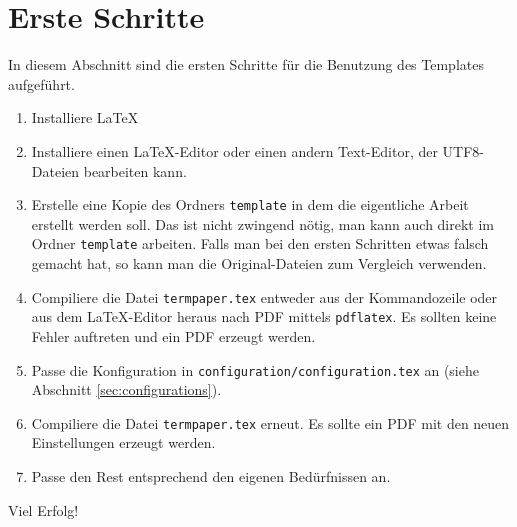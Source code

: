 %
\section{Erste Schritte}
In diesem Abschnitt sind die ersten Schritte für die Benutzung des Templates aufgeführt.
\begin{enumerate}
\item Installiere \LaTeX
\item Installiere einen \LaTeX-Editor oder einen andern Text-Editor, der UTF8-Dateien bearbeiten kann.
\item Erstelle eine Kopie des Ordners \texttt{template} in dem die eigentliche Arbeit erstellt werden soll. Das ist nicht zwingend nötig, man kann auch direkt im Ordner \texttt{template} arbeiten. Falls man bei den ersten Schritten etwas falsch gemacht hat, so kann man die Original-Dateien zum Vergleich verwenden.
\item Compiliere die Datei \texttt{termpaper.tex} entweder aus der Kommandozeile oder aus dem \LaTeX-Editor heraus nach PDF mittels \texttt{pdflatex}. Es sollten keine Fehler auftreten und ein PDF erzeugt werden.
\item Passe die Konfiguration in \texttt{configuration/configuration.tex} an (siehe Abschnitt \ref{sec:configurations}).
\item Compiliere die Datei \texttt{termpaper.tex} erneut. Es sollte ein PDF mit den neuen Einstellungen erzeugt werden.
\item Passe den Rest entsprechend den eigenen Bedürfnissen an.
\end{enumerate}

Viel Erfolg!
